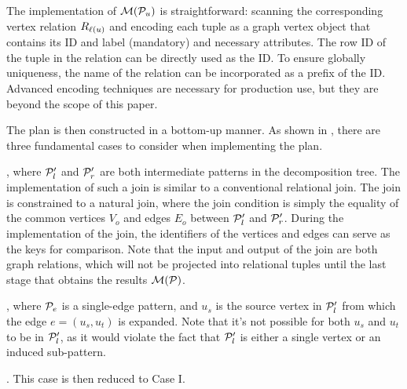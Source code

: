 
The implementation of $\mathcal{M}(\mathcal{P}_u)$ is straightforward: scanning the corresponding vertex relation ${R_{\mathcal{\ell}(u)}}$ and encoding each tuple as a graph vertex object that contains its ID and label (mandatory) and necessary attributes. The row ID of the tuple in the relation can be directly used as the ID. To ensure globally uniqueness, the name of the relation can be incorporated as a prefix of the ID. Advanced encoding techniques are necessary for production use, but they are beyond the scope of this paper.

The plan is then constructed in a bottom-up manner. As shown in , there are three fundamental cases to consider when implementing the plan.

, where $\mathcal{P}_l'$ and $\mathcal{P}'_r$ are both intermediate patterns in the decomposition tree. The implementation of such a join is similar to a conventional relational join. The join is constrained to a natural join, where the join condition is simply the equality of the common vertices $V_o$ and edges $E_o$ between $\mathcal{P}_l'$ and $\mathcal{P}_r'$. During the implementation of the join, the identifiers of the vertices and edges can serve as the keys for comparison. Note that the input and output of the join are both graph relations, which will not
be projected into relational tuples until the last stage that obtains the results $\mathcal{M}(\mathcal{P})$.

, where $\mathcal{P}_e$ is a single-edge pattern, and $u_s$ is the source vertex in $\mathcal{P}'_l$ from which the edge $e = (u_s, u_t)$ is expanded. Note that it's not possible for both $u_s$ and $u_t$ to be in $\mathcal{P}'_l$, as it would violate the fact that $\mathcal{P}'_l$ is either a single vertex or an induced sub-pattern.

.
This case is then reduced to Case I. %


